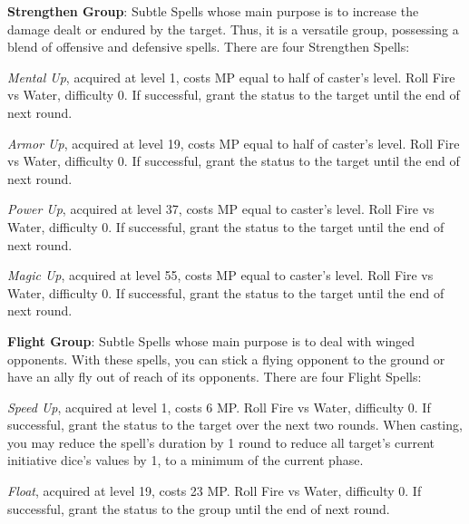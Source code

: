 \begin{multicols}{2}
    \ffcrystal[type=level,height=8pt]
   
    \textbf{Strengthen Group}: Subtle Spells whose main purpose is to increase the damage dealt or endured by the target. Thus, it is a versatile group, possessing a blend of offensive and defensive spells. There are four Strengthen Spells:
    
    \textit{Mental Up}, acquired at level 1, costs MP equal to half of caster's level. Roll Fire vs Water, difficulty 0. If successful, grant the  status to the target until the end of next round.

    \textit{Armor Up}, acquired at level 19, costs MP equal to half of caster's level. Roll Fire vs Water, difficulty 0. If successful, grant the  status to the target until the end of next round.
    
    \textit{Power Up}, acquired at level 37, costs MP equal to caster's level. Roll Fire vs Water, difficulty 0. If successful, grant the  status to the target until the end of next round.
    
    \textit{Magic Up}, acquired at level 55, costs MP equal to caster's level. Roll Fire vs Water, difficulty 0. If successful, grant the  status to the target until the end of next round.
 
    \ffcrystal[type=level,height=8pt]
   
    \textbf{Flight Group}: Subtle Spells whose main purpose is to deal with winged opponents. With these spells, you can stick a flying opponent to the ground or have an ally fly out of reach of its opponents. There are four Flight Spells:
    
    \textit{Speed Up}, acquired at level 1, costs 6 MP\@. Roll Fire vs Water, difficulty 0. If successful, grant the  status to the target over the next two rounds. When casting, you may reduce the spell's duration by 1 round to reduce all target's current initiative dice's values by 1, to a minimum of the current phase.
    
    \textit{Float}, acquired at level 19, costs 23 MP\@. Roll Fire vs Water, difficulty 0. If successful, grant the  status to the group until the end of next round.
    

\end{multicols}

